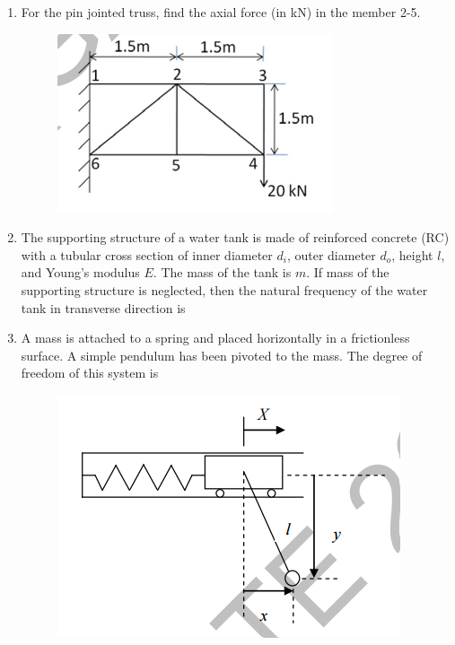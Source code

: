 \documentclass[a4paper,10pt]{article}
\begin{document}
\begin{enumerate}
    \item For the pin jointed truss, find the axial force (in kN) in the member 2-5.
    \begin{figure}[H] \centering \includegraphics[width=0.4\columnwidth]{q6_solid.png} \caption*{} \label{fig:q6_solid} \end{figure}
    
    \hfill{}

    \item The supporting structure of a water tank is made of reinforced concrete (RC) with a tubular cross section of inner diameter $d_i$, outer diameter $d_o$, height $l$, and Young's modulus $E$. The mass of the tank is $m$. If mass of the supporting structure is neglected, then the natural frequency of the water tank in transverse direction is
    
    \hfill{}
    \begin{enumerate}
    \end{enumerate}

    \item A mass is attached to a spring and placed horizontally in a frictionless surface. A simple pendulum has been pivoted to the mass. The degree of freedom of this system is
    \begin{figure}[H] \centering \includegraphics[width=0.5\columnwidth]{q8_solid.png} \caption*{} \label{fig:q8_solid} \end{figure}
    

\end{enumerate}
\end{document}
